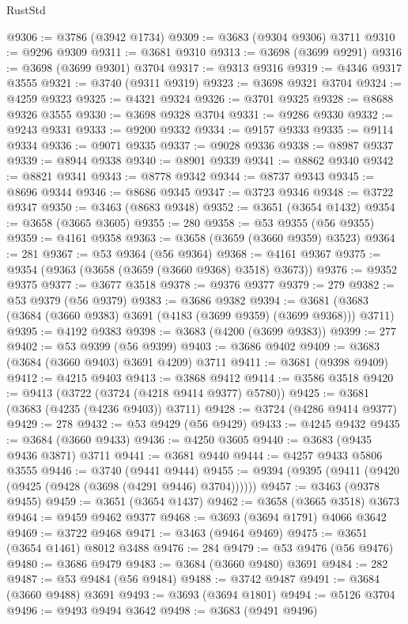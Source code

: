 \begin{lexlean}{RustStd}
\begin{coremodule}
{\begin{coremodule}
{{{{{{{{{{{{{{{{{{{{{{{{{{{{{{{{{{{{{{{{{{{{{{{@9306 := @3786 (@3942 @1734)
@9309 := @3683 (@9304 @9306) @3711
@9310 := @9296 @9309
@9311 := @3681 @9310
@9313 := @3698 (@3699 @9291)
@9316 := @3698 (@3699 @9301) @3704
@9317 := @9313 @9316
@9319 := @4346 @9317 @3555
@9321 := @3740 (@9311 @9319)
@9323 := @3698 @9321 @3704
@9324 := @4259 @9323
@9325 := @4321 @9324
@9326 := @3701 @9325
@9328 := @8688 @9326 @3555
@9330 := @3698 @9328 @3704
@9331 := @9286 @9330
@9332 := @9243 @9331
@9333 := @9200 @9332
@9334 := @9157 @9333
@9335 := @9114 @9334
@9336 := @9071 @9335
@9337 := @9028 @9336
@9338 := @8987 @9337
@9339 := @8944 @9338
@9340 := @8901 @9339
@9341 := @8862 @9340
@9342 := @8821 @9341
@9343 := @8778 @9342
@9344 := @8737 @9343
@9345 := @8696 @9344
@9346 := @8686 @9345
@9347 := @3723 @9346
@9348 := @3722 @9347
@9350 := @3463 (@8683 @9348)
@9352 := @3651 (@3654 @1432)
@9354 := @3658 (@3665 @3605)
@9355 := 280
@9358 := @53 @9355 (@56 @9355)
@9359 := @4161 @9358
@9363 := @3658 (@3659 (@3660 @9359) @3523)
@9364 := 281
@9367 := @53 @9364 (@56 @9364)
@9368 := @4161 @9367
@9375 := @9354 (@9363 (@3658 (@3659 (@3660 @9368) @3518) @3673))
@9376 := @9352 @9375
@9377 := @3677 @3518
@9378 := @9376 @9377
@9379 := 279
@9382 := @53 @9379 (@56 @9379)
@9383 := @3686 @9382
@9394 := @3681 (@3683 (@3684 (@3660 @9383) @3691 (@4183 (@3699 @9359) (@3699 @9368))) @3711)
@9395 := @4192 @9383
@9398 := @3683 (@4200 (@3699 @9383))
@9399 := 277
@9402 := @53 @9399 (@56 @9399)
@9403 := @3686 @9402
@9409 := @3683 (@3684 (@3660 @9403) @3691 @4209) @3711
@9411 := @3681 (@9398 @9409)
@9412 := @4215 @9403
@9413 := @3868 @9412
@9414 := @3586 @3518
@9420 := @9413 (@3722 (@3724 (@4218 @9414 @9377) @5780))
@9425 := @3681 (@3683 (@4235 (@4236 @9403)) @3711)
@9428 := @3724 (@4286 @9414 @9377)
@9429 := 278
@9432 := @53 @9429 (@56 @9429)
@9433 := @4245 @9432
@9435 := @3684 (@3660 @9433)
@9436 := @4250 @3605
@9440 := @3683 (@9435 @9436 @3871) @3711
@9441 := @3681 @9440
@9444 := @4257 @9433 @5806 @3555
@9446 := @3740 (@9441 @9444)
@9455 := @9394 (@9395 (@9411 (@9420 (@9425 (@9428 (@3698 (@4291 @9446) @3704))))))
@9457 := @3463 (@9378 @9455)
@9459 := @3651 (@3654 @1437)
@9462 := @3658 (@3665 @3518) @3673
@9464 := @9459 @9462 @9377
@9468 := @3693 (@3694 @1791) @4066 @3642
@9469 := @3722 @9468
@9471 := @3463 (@9464 @9469)
@9475 := @3651 (@3654 @1461) @8012 @3488
@9476 := 284
@9479 := @53 @9476 (@56 @9476)
@9480 := @3686 @9479
@9483 := @3684 (@3660 @9480) @3691
@9484 := 282
@9487 := @53 @9484 (@56 @9484)
@9488 := @3742 @9487
@9491 := @3684 (@3660 @9488) @3691
@9493 := @3693 (@3694 @1801)
@9494 := @5126 @3704
@9496 := @9493 @9494 @3642
@9498 := @3683 (@9491 @9496)
}}}}}}}}}}}}}}}}}}}}}}}}}}}}}}}}}}}}}}}}}}}}}}}
\end{coremodule}}
\end{coremodule}
\end{lexlean}
